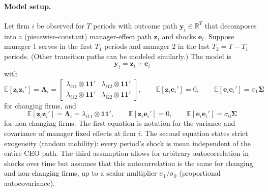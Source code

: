 \documentclass[11pt,a4paper]{article}
\begin{document}
\paragraph{Model setup.} Let firm $i$ be observed for $T$ periods with outcome path $\mathbf y_i\in\mathbb R^T$ that decomposes into a (piecewise-constant) manager-effect path $\mathbf z_i$ and shocks $\mathbf e_i$. Suppose manager 1 serves in the first $T_1$ periods and manager 2 in the last $T_2=T-T_1$ periods. (Other transition paths can be modeled similarly.) The model is
\begin{equation}
\mathbf y_i = \mathbf z_i + \mathbf e_i
\end{equation}
with 
\begin{equation}
\mathbb E[\mathbf z_i\mathbf z_i']= \mathbf \Lambda_i=
\begin{bmatrix}
  \lambda_{i11}\otimes \mathbf{11}' & \lambda_{i12}\otimes \mathbf{11}'\\
  \lambda_{i12}\otimes \mathbf{11}' & \lambda_{i22}\otimes \mathbf{11}'
\end{bmatrix},
\qquad \mathbb E[\mathbf z_i\mathbf e_i']=0,
\qquad \mathbb E[\mathbf e_i\mathbf e_i']=\sigma_1\mathbf\Sigma
\end{equation}
for changing firms, and 
\begin{equation}
\mathbb E[\mathbf z_i\mathbf z_i']= \mathbf \Lambda_i=
  \lambda_{i11}\otimes \mathbf{11}',
\qquad \mathbb E[\mathbf z_i\mathbf e_i']=0,
\qquad \mathbb E[\mathbf e_i\mathbf e_i']=\sigma_0\mathbf\Sigma
\end{equation}
for non-changing firms. The first equation is notation for the variance and covariance of manager fixed effects at firm $i$. The second equation states strict exogeneity (random mobility): every period's shock is mean independent of the entire CEO path. The third assumption allows for arbitrary autocorrelation in shocks over time but assumes that this autocorrelation is the same for changing and non-changing firms, up to a scalar multiplier $\sigma_1/\sigma_0$ (proportional autocovariance).
\end{document}
